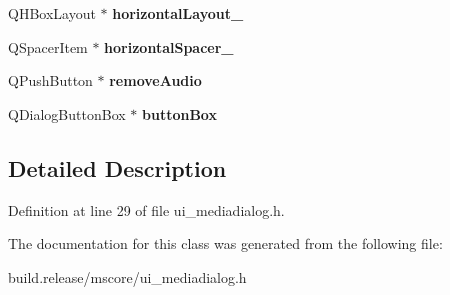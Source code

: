 \begin{DoxyCompactItemize}
Q\+H\+Box\+Layout $\ast$ {\bfseries horizontal\+Layout\+\_}
\item 
\mbox{\label{class_ui___media_dialog_a88143dc73820937afa4cc9c2e6e512fc}} 
Q\+Spacer\+Item $\ast$ {\bfseries horizontal\+Spacer\+\_}
\item 
\mbox{\label{class_ui___media_dialog_a4cc863a1bfdbf0911214a14e61af3793}} 
Q\+Push\+Button $\ast$ {\bfseries remove\+Audio}
\item 
\mbox{\label{class_ui___media_dialog_a8ab0ce6add89e9efbbceeb86afc54823}} 
Q\+Dialog\+Button\+Box $\ast$ {\bfseries button\+Box}
\end{DoxyCompactItemize}


\subsection{Detailed Description}


Definition at line 29 of file ui\+\_\+mediadialog.\+h.



The documentation for this class was generated from the following file\+:\begin{DoxyCompactItemize}
\item 
build.\+release/mscore/ui\+\_\+mediadialog.\+h\end{DoxyCompactItemize}
